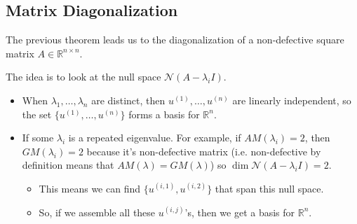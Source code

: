 \subsection{Matrix Diagonalization}
\begin{intuition}
    The previous theorem leads us to the diagonalization of a non-defective square matrix $A \in \mathbb{R}^{n \times n}$. 
    \vspace{1em}

    The idea is to look at the null space $\mathcal{N}(A - \lambda_i I)$. 
    \begin{itemize}
        \item When $\lambda_1, \ldots, \lambda_n$ are distinct, then $u^{(1)}, \ldots, u^{(n)}$ are linearly independent, so the set $\{u^{(1)}, \ldots, u^{(n)}\}$ forms a basis for $\mathbb{R}^n$.
        \item If some $\lambda_i$ is a repeated eigenvalue. For example, if $AM(\lambda_i) = 2$, then $GM(\lambda_i) = 2$ because it's non-defective matrix (i.e. non-defective by definition means that $AM(\lambda)=GM(\lambda)$) so $\dim \mathcal{N}(A - \lambda_i I) = 2$. 
        \begin{itemize}
            \item This means we can find $\{u^{(i,1)}, u^{(i,2)}\}$ that span this null space.
            \item So, if we assemble all these $u^{(i,j)}$'s, then we get a basis for $\mathbb{R}^n$.
        \end{itemize}
    \end{itemize}
\end{intuition}

